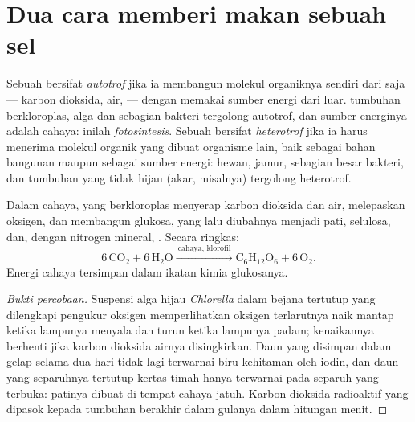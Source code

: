 \section{Dua cara memberi makan sebuah sel}

\begin{definition}\label{def:g10:cell-metabolism:autotrophy}
Sebuah  bersifat \emph{autotrof} jika ia membangun
molekul organiknya sendiri dari  saja --- karbon
dioksida, air,  --- dengan memakai sumber energi dari
luar.  tumbuhan berkloroplas, alga dan sebagian bakteri tergolong
autotrof, dan sumber energinya adalah cahaya: inilah
\emph{fotosintesis}. Sebuah  bersifat
\emph{heterotrof} jika ia harus menerima molekul
organik yang dibuat organisme lain, baik sebagai bahan bangunan maupun
sebagai sumber energi:  hewan, jamur, sebagian besar bakteri, dan
 tumbuhan yang tidak hijau (akar, misalnya) tergolong heterotrof.
\end{definition}

\begin{proposition}[Fotosintesis]\label{prop:g10:cell-metabolism:photosynthesis}
Dalam cahaya,  yang berkloroplas menyerap karbon dioksida dan air,
melepaskan oksigen, dan membangun glukosa, yang lalu diubahnya menjadi
pati, selulosa,  dan, dengan nitrogen mineral, . Secara
ringkas:
\[
6\,\mathrm{CO_2} + 6\,\mathrm{H_2O} \xrightarrow{\ \text{cahaya, klorofil}\ }
\mathrm{C_6H_{12}O_6} + 6\,\mathrm{O_2}.
\]
Energi cahaya tersimpan dalam ikatan kimia glukosanya.
\end{proposition}
\begin{proof}[Bukti percobaan]
Suspensi alga hijau \emph{Chlorella} dalam bejana tertutup yang
dilengkapi pengukur oksigen memperlihatkan oksigen terlarutnya naik
mantap ketika lampunya menyala dan turun ketika lampunya padam;
kenaikannya berhenti jika karbon dioksida airnya disingkirkan. Daun
yang disimpan dalam gelap selama dua hari tidak lagi terwarnai biru
kehitaman oleh iodin, dan daun yang separuhnya tertutup kertas timah
hanya terwarnai pada separuh yang terbuka: patinya dibuat di tempat
cahaya jatuh. Karbon dioksida radioaktif yang dipasok kepada tumbuhan
berakhir dalam gulanya dalam hitungan menit.
\end{proof}

